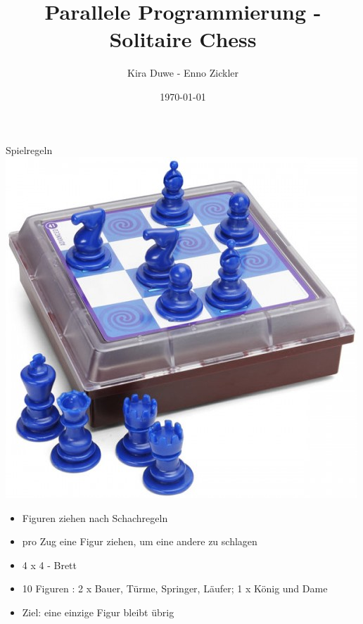 \documentclass{beamer}
\title{Parallele Programmierung - Solitaire Chess}
\author{Kira Duwe - Enno Zickler}
\institute{DKRZ- UHH}
\date{\today}
\begin{document}
\begin{frame}
\titlepage
\end{frame}


\begin{frame}{Spielregeln}
\includegraphics[scale=0.2]{solitaire}
\begin{itemize}

	\item Figuren ziehen nach Schachregeln
	\item pro Zug eine Figur ziehen, um eine andere zu schlagen
	\item 4 x 4 - Brett
	\item 10 Figuren : 2 x Bauer, Türme, Springer, Läufer; 1 x König und Dame
	\item Ziel: eine einzige Figur bleibt übrig

\end{itemize}
\end{frame}
\end{document}
